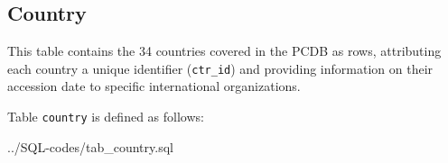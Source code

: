 \subsection{Country}\label{subsec_tab_country}
This table contains the 34 countries covered in the PCDB as rows, attributing each country a unique identifier (\texttt{\footnotesize ctr\_id}) and providing information on their accession date to specific international organizations. 

%

Table \texttt{\footnotesize country} is defined as follows:

%
{../SQL-codes/tab_country.sql}
